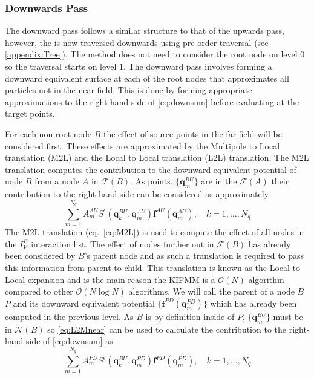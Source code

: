 \subsubsection{Downwards Pass}
The downward pass follows a similar structure to that of the upwards pass, however, the  is now traversed downwards using pre-order traversal (see \cref{appendix:Tree}). The method does not need to consider the root node on level $0$ so the traversal starts on level $1$. The downward pass involves forming a downward equivalent surface at each of the root nodes that approximates all particles not in the near field. This is done by forming appropriate approximations to the right-hand side of \cref{eq:downsum} before evaluating at the target points.

For each non-root node $B$ the effect of source points in the far field will be considered first. These effects are approximated by the Multipole to Local translation (M2L) and the Local to Local translation (L2L) translation. The M2L translation computes the contribution to the downward equivalent potential of node $B$ from a node $A$ in $\mathcal{F}(B)$. As points, $\{\bm{q}^{BU}_m\}$ are in the $\mathcal{F}(A)$ their contribution to the right-hand side can be considered as approximately
\begin{equation}
\label{eq:M2L}
\sum_{m=1}^{N_{q}} A_{m}^{A U} S^\epsilon\left(\bm{q}_{k}^{B U}, \bm{q}_{m}^{A U}\right) \bm{f}^{A U}\left(\bm{q}_{m}^{A U}\right), \quad k=1,\dots,N_q
\end{equation}
The M2L translation (eq.~\ref{eq:M2L}) is used to compute the effect of all nodes in the $I_V^B$ interaction list. The effect of nodes further out in $\mathcal{F}(B)$ has already been considered by $B$'s parent node and as such a translation is required to pass this information from parent to child. This translation is known as the Local to Local expansion and is the main reason the KIFMM is a $\mathcal{O}(N)$ algorithm compared to other $\mathcal{O}(N\log N)$ algorithms. We will call the parent of a node $B$ $P$ and its downward equivalent potential $\{\bm{f}^{PD}(\bm{q}^{PD}_m)\}$ which has already been computed in the previous level. As $B$ is by definition inside of $P$, $\{\bm{q}^{BU}_m\}$ must be in $\mathcal{N}(B)$ so \cref{eq:L2Mnear} can be used to calculate the contribution to the right-hand side of \cref{eq:downsum} as
\begin{equation}
\label{eq:L2L}
\sum_{m=1}^{N_{q}} A_{m}^{P D} S^\epsilon\left(\bm{q}_{k}^{B U}, \bm{q}_{m}^{P D}\right) \bm{f}^{P D}\left(\bm{q}_{m}^{P D}\right), \quad k=1,\dots,N_q
\end{equation}
